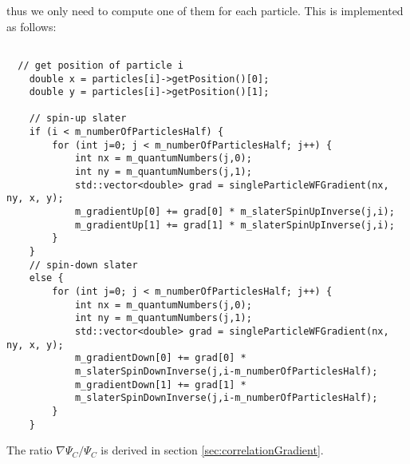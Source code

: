 \documentclass[english, a4paper]{article}
\begin{document}
thus we only need to compute one of them for each particle. This is implemented as follows:
\belowcaptionskip=-10pt
\begin{lstlisting}[label=slaterGradient,caption=Computation of the Slater gradient ratio for particle i. 
The spin-up matrix only contains the single-particle wave functions as functions of the first half of the 
particles. The spin-down matrix is a function of the second half. One of them is thus
zero for a given particle $i$.]

  // get position of particle i
    double x = particles[i]->getPosition()[0];
    double y = particles[i]->getPosition()[1];

    // spin-up slater
    if (i < m_numberOfParticlesHalf) {
        for (int j=0; j < m_numberOfParticlesHalf; j++) {
            int nx = m_quantumNumbers(j,0);
            int ny = m_quantumNumbers(j,1);
            std::vector<double> grad = singleParticleWFGradient(nx, ny, x, y);
            m_gradientUp[0] += grad[0] * m_slaterSpinUpInverse(j,i);
            m_gradientUp[1] += grad[1] * m_slaterSpinUpInverse(j,i);
        }
    }
    // spin-down slater
    else {
        for (int j=0; j < m_numberOfParticlesHalf; j++) {
            int nx = m_quantumNumbers(j,0);
            int ny = m_quantumNumbers(j,1);
            std::vector<double> grad = singleParticleWFGradient(nx, ny, x, y);
            m_gradientDown[0] += grad[0] * 
            m_slaterSpinDownInverse(j,i-m_numberOfParticlesHalf);
            m_gradientDown[1] += grad[1] * 
            m_slaterSpinDownInverse(j,i-m_numberOfParticlesHalf);
        }
    }
\end{lstlisting}
The ratio $\nabla \Psi_C / \Psi_C$ is derived in section \ref{sec:correlationGradient}.
\end{document}
